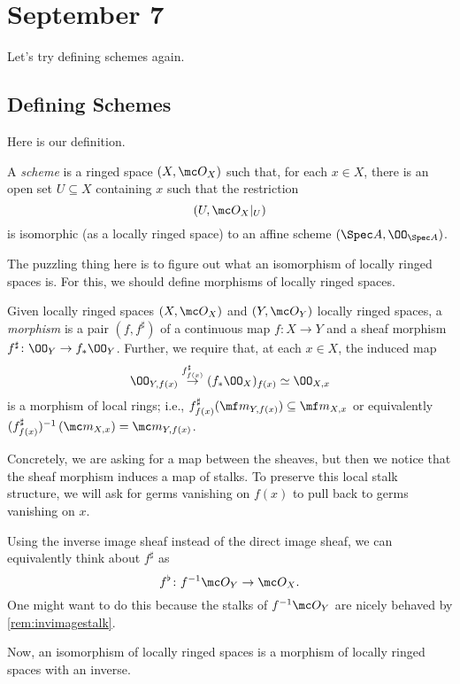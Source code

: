 \documentclass[../notes.tex]{subfiles}
\begin{document}
\section{September 7}
Let's try defining schemes again.

\subsection{Defining Schemes}
Here is our definition.
\begin{definition}[Scheme]
	A \textit{scheme} is a ringed space $(X,\mc O_X)$ such that, for each $x\in X$, there is an open set $U\subseteq X$ containing $x$ such that the restriction
	\[(U,\mc O_X|_U)\]
	is isomorphic (as a locally ringed space) to an affine scheme $(\Spec A,\OO_{\Spec A})$.
\end{definition}
The puzzling thing here is to figure out what an isomorphism of locally ringed spaces is. For this, we should define morphisms of locally ringed spaces.
\begin{definition}
	Given locally ringed spaces $(X,\mc O_X)$ and $(Y,\mc O_Y)$ locally ringed spaces, a \textit{morphism} is a pair $(f,f^\sharp)$ of a continuous map $f\colon X\to Y$ and a sheaf morphism $f^\sharp\colon\OO_Y\to f_*\OO_Y$. Further, we require that, at each $x\in X$, the induced map
	\[\OO_{Y,f(x)}\stackrel{f^\sharp_{f(x)}}\to(f_*\OO_X)_{f(x)}\simeq\OO_{X,x}\]
	is a morphism of local rings; i.e., $f^\sharp_{f(x)}(\mf m_{Y,f(x)})\subseteq\mf m_{X,x}$ or equivalently $(f^\sharp_{f(x)})^{-1}\left(\mc m_{X,x}\right)=\mc m_{Y,f(x)}$.
\end{definition}
Concretely, we are asking for a map between the sheaves, but then we notice that the sheaf morphism induces a map of stalks. To preserve this local stalk structure, we will ask for germs vanishing on $f(x)$ to pull back to germs vanishing on $x$.
\begin{remark}
	Using the inverse image sheaf instead of the direct image sheaf, we can equivalently think about $f^\sharp$ as
	\[f^\flat\colon f^{-1}\mc O_Y\to\mc O_X.\]
	One might want to do this because the stalks of $f^{-1}\mc O_Y$ are nicely behaved by \autoref{rem:invimagestalk}.
\end{remark}
Now, an isomorphism of locally ringed spaces is a morphism of locally ringed spaces with an inverse.
\end{document}
